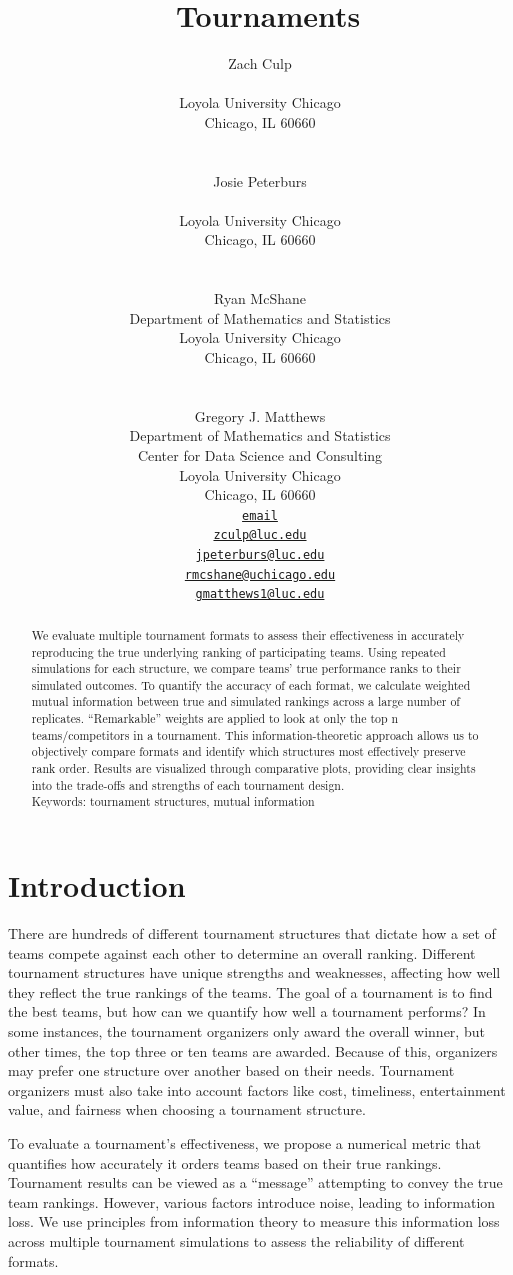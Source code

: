 \documentclass[
  12pt,
]{article}
\title{~\large Tournaments}
\author{\large Zach Culp \vspace{-1.1mm}\\
\normalsize  \vspace{-1mm}\\
\normalsize Loyola University Chicago \vspace{-1mm}\\
\normalsize Chicago, IL 60660 \vspace{-1mm}\\
\strut \\
\large Josie Peterburs \vspace{-1.1mm}\\
\normalsize \vspace{-1mm}\\
\normalsize Loyola University Chicago \vspace{-1mm}\\
\normalsize Chicago, IL 60660 \vspace{-1mm}\\
\strut \\
\large Ryan McShane \vspace{-1.1mm}\\
\normalsize Department of Mathematics and Statistics \vspace{-1mm}\\
\normalsize Loyola University Chicago \vspace{-1mm}\\
\normalsize Chicago, IL 60660 \vspace{-1mm}\\
\strut \\
\large Gregory J. Matthews \vspace{-1.1mm}\\
\normalsize Department of Mathematics and Statistics \vspace{-1mm}\\
\normalsize Center for Data Science and Consulting \vspace{-1mm}\\
\normalsize Loyola University Chicago \vspace{-1mm}\\
\normalsize Chicago, IL 60660 \vspace{-1mm}\\
\normalsize \href{mailto:ypu@something.edu}{\texttt{email}}
\vspace{-1mm}\\
\normalsize \href{mailto:zculp@luc.edu}{\texttt{zculp@luc.edu}}
\vspace{-1mm}\\
\normalsize \href{mailto:jpeterburs@luc.edu}{\texttt{jpeterburs@luc.edu}}
\vspace{-1mm}\\
\normalsize \href{mailto:rmcshane@uchicago.edu}{\texttt{rmcshane@uchicago.edu}}
\vspace{-1mm}\\
\normalsize \href{mailto:gmatthews1@luc.edu}{\texttt{gmatthews1@luc.edu}}
\vspace{-1mm}}
\date{}
\begin{document}
\maketitle
\begin{abstract}
We evaluate multiple tournament formats to assess their effectiveness in
accurately reproducing the true underlying ranking of participating
teams. Using repeated simulations for each structure, we compare teams'
true performance ranks to their simulated outcomes. To quantify the
accuracy of each format, we calculate weighted mutual information
between true and simulated rankings across a large number of replicates.
``Remarkable'' weights are applied to look at only the top n
teams/competitors in a tournament. This information-theoretic approach
allows us to objectively compare formats and identify which structures
most effectively preserve rank order. Results are visualized through
comparative plots, providing clear insights into the trade-offs and
strengths of each tournament design.\\

\vspace{2mm} \textbar{} Keywords: tournament structures, mutual
information
\end{abstract}

\section{Introduction}\label{introduction}

There are hundreds of different tournament structures that dictate how a
set of teams compete against each other to determine an overall ranking.
Different tournament structures have unique strengths and weaknesses,
affecting how well they reflect the true rankings of the teams. The goal
of a tournament is to find the best teams, but how can we quantify how
well a tournament performs? In some instances, the tournament organizers
only award the overall winner, but other times, the top three or ten
teams are awarded. Because of this, organizers may prefer one structure
over another based on their needs. Tournament organizers must also take
into account factors like cost, timeliness, entertainment value, and
fairness when choosing a tournament structure.

To evaluate a tournament's effectiveness, we propose a numerical metric
that quantifies how accurately it orders teams based on their true
rankings. Tournament results can be viewed as a ``message'' attempting
to convey the true team rankings. However, various factors introduce
noise, leading to information loss. We use principles from information
theory to measure this information loss across multiple tournament
simulations to assess the reliability of different formats.
\end{document}
